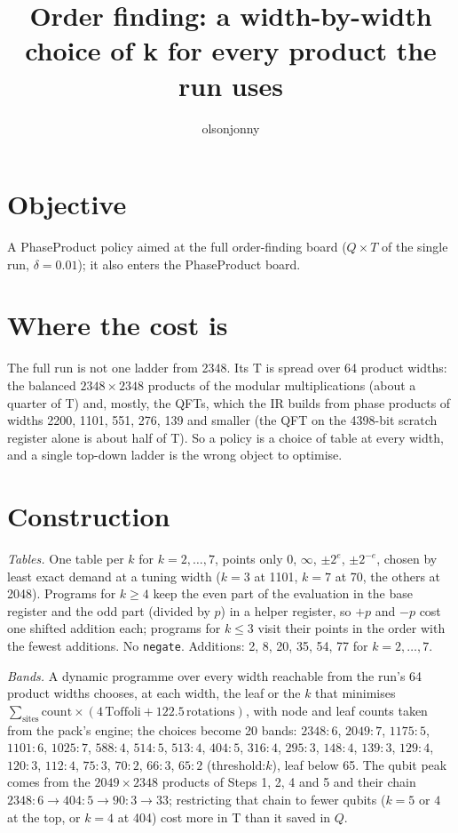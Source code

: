 \documentclass[11pt]{article}
\title{Order finding: a width-by-width choice of k for every product the run uses}
\author{olsonjonny}
\date{}
\begin{document}
\maketitle

\section*{Objective}
A PhaseProduct policy aimed at the full order-finding board ($Q \times T$ of the single run, $\delta = 0.01$); it also enters the PhaseProduct board.

\section*{Where the cost is}
The full run is not one ladder from 2348. Its T is spread over 64 product widths: the balanced $2348 \times 2348$ products of the modular multiplications (about a quarter of T) and, mostly, the QFTs, which the IR builds from phase products of widths 2200, 1101, 551, 276, 139 and smaller (the QFT on the 4398-bit scratch register alone is about half of T).
So a policy is a choice of table at every width, and a single top-down ladder is the wrong object to optimise.

\section*{Construction}
\emph{Tables.} One table per $k$ for $k = 2, \dots, 7$, points only $0$, $\infty$, $\pm 2^e$, $\pm 2^{-e}$, chosen by least exact demand at a tuning width ($k = 3$ at 1101, $k = 7$ at 70, the others at 2048).
Programs for $k \ge 4$ keep the even part of the evaluation in the base register and the odd part (divided by $p$) in a helper register, so $+p$ and $-p$ cost one shifted addition each; programs for $k \le 3$ visit their points in the order with the fewest additions. No \texttt{negate}.
Additions: 2, 8, 20, 35, 54, 77 for $k = 2, \dots, 7$.

\emph{Bands.} A dynamic programme over every width reachable from the run's 64 product widths chooses, at each width, the leaf or the $k$ that minimises $\sum_{\text{sites}} \mathrm{count} \times (4\,\text{Toffoli} + 122.5\,\text{rotations})$, with node and leaf counts taken from the pack's engine; the choices become 20 bands:
$2348{:}6$, $2049{:}7$, $1175{:}5$, $1101{:}6$, $1025{:}7$, $588{:}4$, $514{:}5$, $513{:}4$, $404{:}5$, $316{:}4$, $295{:}3$, $148{:}4$, $139{:}3$, $129{:}4$, $120{:}3$, $112{:}4$, $75{:}3$, $70{:}2$, $66{:}3$, $65{:}2$ (threshold:$k$), leaf below 65.
The qubit peak comes from the $2049 \times 2348$ products of Steps 1, 2, 4 and 5 and their chain $2348{:}6 \to 404{:}5 \to 90{:}3 \to 33$; restricting that chain to fewer qubits ($k = 5$ or $4$ at the top, or $k = 4$ at 404) cost more in T than it saved in $Q$.
\end{document}

